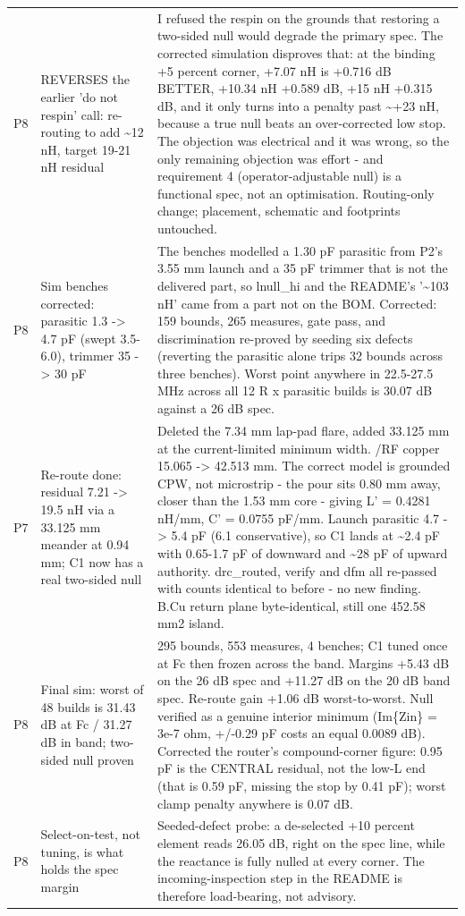 \documentclass[11pt,a4paper]{article}
\begin{document}
{\begin{longtable}{lp{5.2cm}p{7.2cm}}
P8 & REVERSES the earlier 'do not respin' call: re-routing to add \textasciitilde{}12 nH, target 19-21 nH residual & I refused the respin on the grounds that restoring a two-sided null would degrade the primary spec. The corrected simulation disproves that: at the binding +5 percent corner, +7.07 nH is +0.716 dB BETTER, +10.34 nH +0.589 dB, +15 nH +0.315 dB, and it only turns into a penalty past \textasciitilde{}+23 nH, because a true null beats an over-corrected low stop. The objection was electrical and it was wrong, so the only remaining objection was effort - and requirement 4 (operator-adjustable null) is a functional spec, not an optimisation. Routing-only change; placement, schematic and footprints untouched. \\
P8 & Sim benches corrected: parasitic 1.3 -\textgreater{} 4.7 pF (swept 3.5-6.0), trimmer 35 -\textgreater{} 30 pF & The benches modelled a 1.30 pF parasitic from P2's 3.55 mm launch and a 35 pF trimmer that is not the delivered part, so lnull\_hi and the README's '\textasciitilde{}103 nH' came from a part not on the BOM. Corrected: 159 bounds, 265 measures, gate pass, and discrimination re-proved by seeding six defects (reverting the parasitic alone trips 32 bounds across three benches). Worst point anywhere in 22.5-27.5 MHz across all 12 R x parasitic builds is 30.07 dB against a 26 dB spec. \\
P7 & Re-route done: residual 7.21 -\textgreater{} 19.5 nH via a 33.125 mm meander at 0.94 mm; C1 now has a real two-sided null & Deleted the 7.34 mm lap-pad flare, added 33.125 mm at the current-limited minimum width. /RF copper 15.065 -\textgreater{} 42.513 mm. The correct model is grounded CPW, not microstrip - the pour sits 0.80 mm away, closer than the 1.53 mm core - giving L' = 0.4281 nH/mm, C' = 0.0755 pF/mm. Launch parasitic 4.7 -\textgreater{} 5.4 pF (6.1 conservative), so C1 lands at \textasciitilde{}2.4 pF with 0.65-1.7 pF of downward and \textasciitilde{}28 pF of upward authority. drc\_routed, verify and dfm all re-passed with counts identical to before - no new finding. B.Cu return plane byte-identical, still one 452.58 mm2 island. \\
P8 & Final sim: worst of 48 builds is 31.43 dB at Fc / 31.27 dB in band; two-sided null proven & 295 bounds, 553 measures, 4 benches; C1 tuned once at Fc then frozen across the band. Margins +5.43 dB on the 26 dB spec and +11.27 dB on the 20 dB band spec. Re-route gain +1.06 dB worst-to-worst. Null verified as a genuine interior minimum (Im\{Zin\} = 3e-7 ohm, +/-0.29 pF costs an equal 0.0089 dB). Corrected the router's compound-corner figure: 0.95 pF is the CENTRAL residual, not the low-L end (that is 0.59 pF, missing the stop by 0.41 pF); worst clamp penalty anywhere is 0.07 dB. \\
P8 & Select-on-test, not tuning, is what holds the spec margin & Seeded-defect probe: a de-selected +10 percent element reads 26.05 dB, right on the spec line, while the reactance is fully nulled at every corner. The incoming-inspection step in the README is therefore load-bearing, not advisory. \\
\bottomrule
\end{longtable}
}
\end{document}

